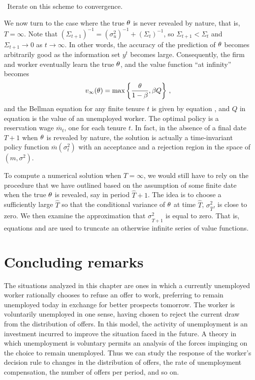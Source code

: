  \ Iterate on this scheme to convergence.

\medskip

We now turn to the case where the true $\th$ is never revealed by
nature, that is, $T=\infty$. Note that
$(\Sigma_{t+1})^{-1} = (\sigma_u^2)^{-1} + (\Sigma_{t})^{-1}$,
so $\Sigma_{t+1} < \Sigma_{t}$ and $\Sigma_{t+1} \rightarrow 0$
as $t \rightarrow \infty$. In other words, the accuracy of the
prediction of $\th$ becomes arbitrarily good as the information
set $y^t$ becomes large. Consequently, the
firm and worker eventually learn the true $\th$, and
the value function  ``at infinity'' becomes
$$v_{\infty}(\theta) = \max \left\{ {\theta\over 1-\beta},\beta Q\right\}\,,
$$
and the Bellman equation for any finite tenure $t$ is given by
equation , and $Q$ in equation  is the value of an unemployed
worker. The optimal policy is a reservation wage $\overline m_t$,
one for each tenure $t$. In fact, in the absence of a final date $T+1$
when $\th$ is revealed by nature, the solution is
actually a time-invariant policy function $\overline m(\sigma_t^2)$
with an acceptance and a rejection region in the space
of $(m, \sigma^2)$.


To compute a numerical solution when $T=\infty$, we would still
have to rely on the procedure that we have  outlined based on the
assumption of some finite date
when the true $\th$ is revealed,  say in period $\hat T+1$.
The idea is to choose a sufficiently large $\hat T$ so that the
conditional variance of $\th$ at time $\hat T$, $\sigma_{\hat T}^2$,
is close to zero. We then examine the approximation that $\sigma_{\hat T+1}^2$
is equal to zero. That is,
equations  and  are used to truncate an otherwise
infinite series of value functions.

\section{Concluding remarks}

The situations analyzed in this chapter are ones in which a currently
unemployed worker rationally chooses to refuse an offer to work, preferring to
remain unemployed today in exchange for better prospects tomorrow.  The worker
is voluntarily unemployed %
 in one sense, having chosen to reject the current
draw from the distribution of offers.  In  this model, the activity of
unemployment is an investment incurred to improve the situation faced in the
future.  A theory in which unemployment is voluntary
permits an analysis of the forces impinging on the choice to remain
unemployed.  Thus we can study the response of the worker's decision rule to
changes in the distribution of offers, the rate of unemployment compensation,
the number of offers per period, and so on.

